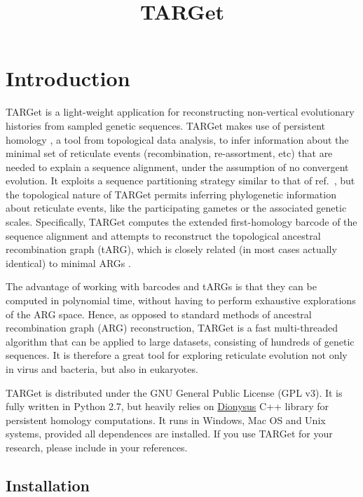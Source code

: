 \documentclass[12pt]{article}
\title{{\LARGE TARGet}}
\begin{document}
\maketitle

\newpage

\section{Introduction}
\label{sec1}

TARGet is a light-weight application for reconstructing non-vertical evolutionary histories from sampled genetic sequences. TARGet makes use of persistent homology \cite{ph, ph2}, a tool from topological data analysis, to infer information about the minimal set of reticulate events (recombination, re-assortment, etc) that are needed 
to explain a sequence alignment, under the assumption of no convergent evolution. It exploits a sequence partitioning strategy similar to that of ref.~\cite{mg}, but the topological nature of TARGet permits inferring phylogenetic information about reticulate events, like the participating gametes or the associated genetic scales. Specifically, TARGet computes the extended first-homology barcode of the sequence alignment and attempts to reconstruct the topological ancestral recombination graph (tARG), which is closely related (in most cases actually identical) to minimal ARGs \cite{target}. 

The advantage of working with barcodes and tARGs is that they can be computed in polynomial time, without having to perform exhaustive explorations of the ARG space. Hence, as opposed to standard methods of ancestral recombination graph (ARG) reconstruction, TARGet is a fast multi-threaded algorithm that can be applied to large datasets, consisting of hundreds of genetic sequences. It is therefore a great tool for exploring reticulate evolution not only in virus and bacteria, but also in eukaryotes.

TARGet is distributed under the GNU General Public License (GPL v3). It is fully written in Python 2.7, but heavily relies on \href{http://www.mrzv.org/software/dionysus/}{Dionysus} C++ library for persistent homology computations. It runs in Windows, Mac OS and Unix systems, provided all dependences are installed. If you use TARGet for your research, please include \cite{target} in your references. 

\subsection*{Installation}
\end{document}
